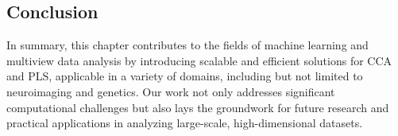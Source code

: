 

\subsection{Conclusion}

In summary, this chapter contributes to the fields of machine learning and multiview data analysis by introducing scalable and efficient solutions for CCA and PLS, applicable in a variety of domains, including but not limited to neuroimaging and genetics.
Our work not only addresses significant computational challenges but also lays the groundwork for future research and practical applications in analyzing large-scale, high-dimensional datasets.